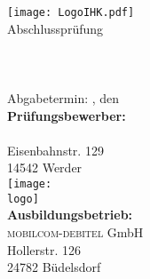 \thispagestyle{plain}
\begin{titlepage}

\begin{center}
\texttt{[image: LogoIHK.pdf]}\\[1ex]
\Large{Abschlussprüfung \pruefungstermin}\\[3ex]

\Large{\ausbildungsberuf}\\
\LARGE{\betreff}\\[4ex]

\huge{\textbf{\titel}}\\[1.5ex]

\normalsize
Abgabetermin: \ort, den \abgabetermin\\[3em]
\textbf{Prüfungsbewerber:}\\
\autor\\
Eisenbahnstr. 129\\
14542 Werder\\[5ex]

\texttt{[image: \\logo]}\\[2ex]
\textbf{Ausbildungsbetrieb:}\\
\textsc{mobilcom-debitel} GmbH\\
Hollerstr. 126\\
24782 Büdelsdorf\\[5em]
\end{center}

\small
\noindent
\end{titlepage}
